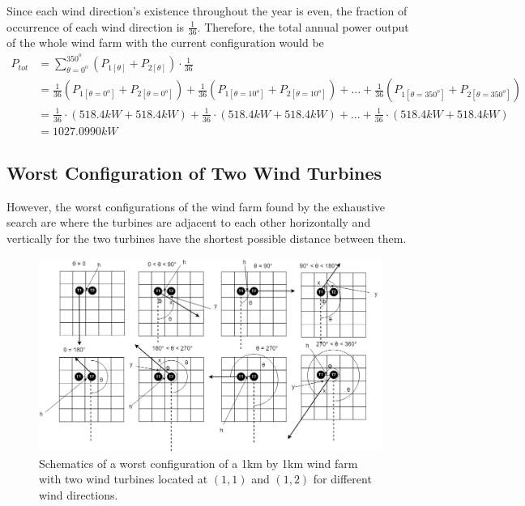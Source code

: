     Since each wind direction's existence throughout the year is even, the fraction of occurrence of each wind direction is $\frac{1}{36}$. Therefore, the total annual power output of the whole wind farm with the current configuration would be
    \begin{align*}
        P_{tot}
        &= \sum_{\theta=0^o}^{350^o} \left( P_{1[\theta]} + P_{2[\theta]} \right) \cdot \frac{1}{36} \\
        &= \frac{1}{36}\left( P_{1[\theta=0^o]} + P_{2[\theta=0^o]} \right) + \frac{1}{36}\left( P_{1[\theta=10^o]} + P_{2[\theta=10^o]} \right) +...+ \frac{1}{36}\left( P_{1[\theta=350^o]} + P_{2[\theta=350^o]} \right) \\
        &= \frac{1}{36}\cdot\left( 518.4kW + 518.4kW \right) + \frac{1}{36}\cdot\left( 518.4kW + 518.4kW \right) +...+ \frac{1}{36}\cdot\left( 518.4kW + 518.4kW \right) \\
        &=1027.0990kW
    \end{align*}
    
    \subsection{Worst Configuration of Two Wind Turbines}
        However, the worst configurations of the wind farm found by the exhaustive search are where the turbines are adjacent to each other horizontally and vertically for the two turbines have the shortest possible distance between them.
        
        \begin{figure}[H]
            \centering
            \includegraphics[width=\linewidth]{Figures/worstSmall.png}
            \caption{Schematics of a worst configuration of a 1km by 1km wind farm with two wind turbines located at $(1,1)$ and $(1,2)$ for different wind directions.}
            \label{worstSmall}
        \end{figure}
        
